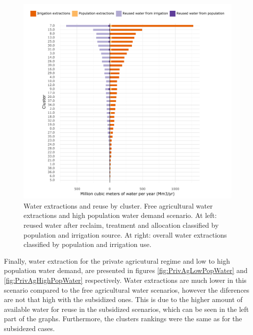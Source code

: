 \documentclass[12pt]{iopart}
\begin{document}
\begin{figure}[!h]
	\centering
	\includegraphics[width=\textwidth]{Free_agri_water_High_pop_water}
	\caption{Water extractions and reuse by cluster. Free agricultural water extractions and high population water demand scenario. At left: reused water after reclaim, treatment and allocation classified by population and irrigation source. At right: overall water extractions classified by population and irrigation use.}
	\label{fig:FreeAgHighPopWater}
\end{figure}
\newpage

Finally, water extraction for the private agricutural regime and low to high population water demand, are presented in figures \ref{fig:PrivAgLowPopWater} and \ref{fig:PrivAgHighPopWater} respectively. Water extractions are much lower in this scenario compared to the free agricultural water scenarios, however the diferences are not that high with the subsidized ones. This is due to the higher amount of available water for reuse in the subsidized scenarios, which can be seen in the left part of the graphs. Furthermore, the clusters rankings were the same as for the subsidezed cases.
\end{document}
